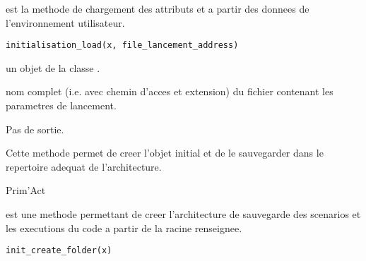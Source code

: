\documentclass[a4paper]{book}
\begin{document}
%
\begin{Description}\relax
{} est la methode de chargement des attributs  et  a partir des donnees de l'environnement utilisateur.
\end{Description}
%
\begin{Usage}
\begin{verbatim}
initialisation_load(x, file_lancement_address)
\end{verbatim}
\end{Usage}
%
\begin{Arguments}
\begin{ldescription}
\item[\code{x}] un objet de la classe .

\item[\code{file\_lancement\_address}] nom complet (i.e. avec chemin d'acces et extension) du fichier contenant les parametres de lancement.
\end{ldescription}
\end{Arguments}
%
\begin{Value}
Pas de sortie.
\end{Value}
%
\begin{Note}\relax
Cette methode permet de creer l'objet  initial et de le sauvegarder dans le repertoire adequat de l'architecture.
\end{Note}
%
\begin{Author}\relax
Prim'Act
\end{Author}
%
\begin{Description}\relax
{} est une methode permettant de creer l'architecture de sauvegarde des scenarios et les executions du code a partir de la racine renseignee.
\end{Description}
%
\begin{Usage}
\begin{verbatim}
init_create_folder(x)
\end{verbatim}
\end{Usage}
\end{document}
